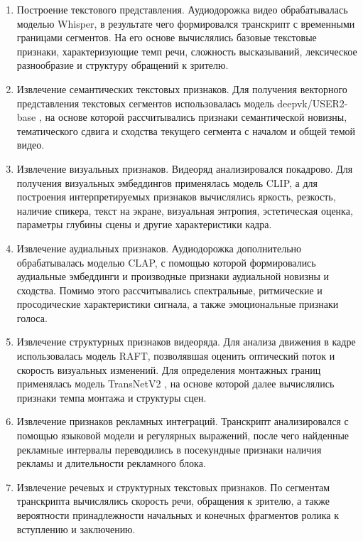 \documentclass[times]{itmo-student-thesis}
\begin{document}
\begin{enumerate}[label=\arabic*.,leftmargin=1.25cm]
    \item Построение текстового представления. Аудиодорожка видео обрабатывалась моделью Whisper, в результате чего формировался транскрипт с временными границами сегментов. На его основе вычислялись базовые текстовые признаки, характеризующие темп речи, сложность высказываний, лексическое разнообразие и структуру обращений к зрителю.
    \item Извлечение семантических текстовых признаков. Для получения векторного представления текстовых сегментов использовалась модель deepvk/USER2-base \cite{deepvk2024user}, на основе которой рассчитывались признаки семантической новизны, тематического сдвига и сходства текущего сегмента с началом и общей темой видео.
    \item Извлечение визуальных признаков. Видеоряд анализировался покадрово. Для получения визуальных эмбеддингов применялась модель CLIP, а для построения интерпретируемых признаков вычислялись яркость, резкость, наличие спикера, текст на экране, визуальная энтропия, эстетическая оценка, параметры глубины сцены и другие характеристики кадра.
    \item Извлечение аудиальных признаков. Аудиодорожка дополнительно обрабатывалась моделью CLAP, с помощью которой формировались аудиальные эмбеддинги и производные признаки аудиальной новизны и сходства. Помимо этого рассчитывались спектральные, ритмические и просодические характеристики сигнала, а также эмоциональные признаки голоса.
    \item Извлечение структурных признаков видеоряда. Для анализа движения в кадре использовалась модель RAFT, позволявшая оценить оптический поток и скорость визуальных изменений. Для определения монтажных границ применялась модель TransNetV2 \cite{soucek2020transnetv2}, на основе которой далее вычислялись признаки темпа монтажа и структуры сцен.
    \item Извлечение признаков рекламных интеграций. Транскрипт анализировался с помощью языковой модели и регулярных выражений, после чего найденные рекламные интервалы переводились в посекундные признаки наличия рекламы и длительности рекламного блока.
    \item Извлечение речевых и структурных текстовых признаков. По сегментам транскрипта вычислялись скорость речи, обращения к зрителю, а также вероятности принадлежности начальных и конечных фрагментов ролика к вступлению и заключению.
\end{enumerate}
\end{document}
